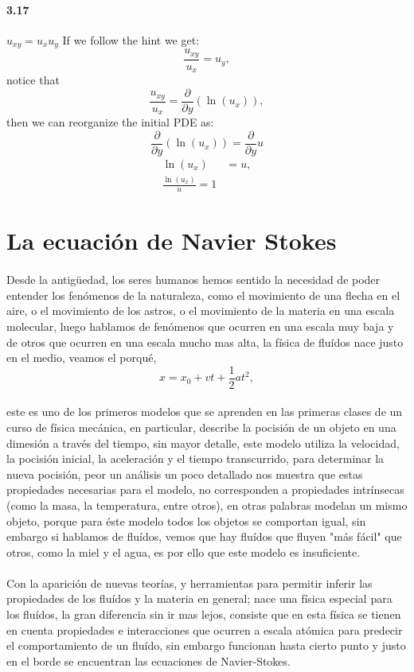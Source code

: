 \documentclass{article}
\begin{document}
\paragraph{3.17} $u_{xy}=u_x u_y$ If we follow the hint we get:
$$\frac{u_{xy}}{u_x} = u_y,$$
notice that
$$\frac{u_{xy}}{u_x} = \frac{\partial}{\partial y}\left(\ln (u_x)\right),$$
then we can reorganize the initial PDE as:
$$\frac{\partial}{\partial y}\left(\ln (u_x)\right) = \frac{\partial}{\partial y} u$$
\begin{align*}
\ln (u_x) &= u,\\
\frac{\ln (u_x)}{u} = 1 	
\end{align*}
\newpage
\section{La ecuación de Navier Stokes}
\paragraph{}Desde la antigüedad, los seres humanos hemos sentido la necesidad de poder entender los fenómenos de la naturaleza, como el movimiento de una flecha en el aire, o el movimiento de los astros, o el movimiento de la materia en una escala molecular, luego hablamos de fenómenos que ocurren en una escala muy baja y de otros que ocurren en una escala mucho mas alta, la física de fluídos nace justo en el medio, veamos el porqué,
$$x= x_0 + vt + \frac{1}{2}at^2,$$
\paragraph{}este es  uno de los primeros modelos que se aprenden en las primeras clases de un curso de física mecánica, en particular, describe la pocisión de un objeto en una dimesión a través del tiempo, sin mayor detalle, este modelo utiliza la velocidad, la pocisión inicial, la aceleración y el tiempo transcurrido, para determinar la nueva pocisión, peor un análisis un poco detallado nos muestra que estas propiedades necesarias para el modelo, no corresponden a propiedades intrínsecas (como la masa, la temperatura, entre otros), en otras palabras modelan un mismo objeto, porque para éste modelo todos los objetos se comportan igual, sin embargo si hablamos de fluídos, vemos que hay fluídos que fluyen "más fácil" que otros, como la miel y el agua, es por ello que este modelo es insuficiente.
\paragraph{}Con la aparición de nuevas teorías, y herramientas para permitir inferir las propiedades de los fluídos y la materia en general; nace una física especial para los fluídos, la gran diferencia sin ir mas lejos, consiste que en esta física se tienen en cuenta propiedades e interacciones que ocurren a escala atómica para predecir el comportamiento de un fluído, sin embargo funcionan hasta cierto punto y justo en el borde se encuentran las ecuaciones de Navier-Stokes.
\end{document}
